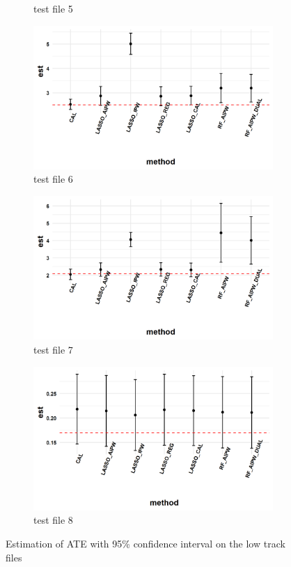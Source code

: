 \documentclass[11pt, oneside]{article}
\begin{document}
\begin{figure}[h]
\begin{subfigure}{0.24\textwidth}
    \caption{test file 5}
  \end{subfigure}
  \begin{subfigure}{0.24\textwidth}
    \includegraphics[width=\textwidth]{../plot/method_comparison_6.png}
    \caption{test file 6}
  \end{subfigure}
  \begin{subfigure}{0.24\textwidth}
    \includegraphics[width=\textwidth]{../plot/method_comparison_7.png}
    \caption{test file 7}
  \end{subfigure}
  \begin{subfigure}{0.24\textwidth}
    \includegraphics[width=\textwidth]{../plot/method_comparison_8.png}
    \caption{test file 8}
  \end{subfigure}
  \caption{Estimation of ATE with 95\% confidence interval on the low track files} 
  \label{fig:twosteplow}
\end{figure}
\end{document}
